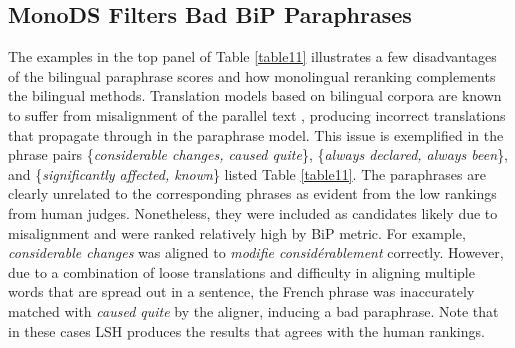 \documentclass[11pt]{article}
\newcommand{\mnote}[1]{\marginpar{\raggedleft\footnotesize\itshape#1}}
\begin{document}
\subsection{MonoDS Filters Bad BiP Paraphrases}
The examples in the top panel of Table \ref{table11} illustrates a few disadvantages of the bilingual paraphrase scores and how monolingual reranking complements the bilingual methods. Translation models based on bilingual corpora are known to suffer from misalignment of the parallel text \cite{BannardCallisonBurch05}, producing incorrect translations that propagate through in the paraphrase model. This issue is exemplified in the phrase pairs \{\emph{considerable changes, caused quite}\}, \{\emph{always declared, always been}\}, and \{\emph{significantly affected, known}\} listed Table \ref{table11}. The paraphrases are clearly unrelated to the corresponding phrases as evident from the low rankings from human judges. Nonetheless, they were included as candidates likely due to misalignment and were ranked relatively high by BiP metric. For example, \emph{considerable changes} was aligned to \emph{modifie consid{\'e}rablement} correctly. However, due to a combination of loose translations and difficulty in aligning multiple words that are spread out in a sentence, the French phrase was inaccurately matched with \emph{caused quite} by the aligner, inducing a bad paraphrase. Note that in these cases LSH produces the results that agrees with the human rankings.


%
%
\end{document}
